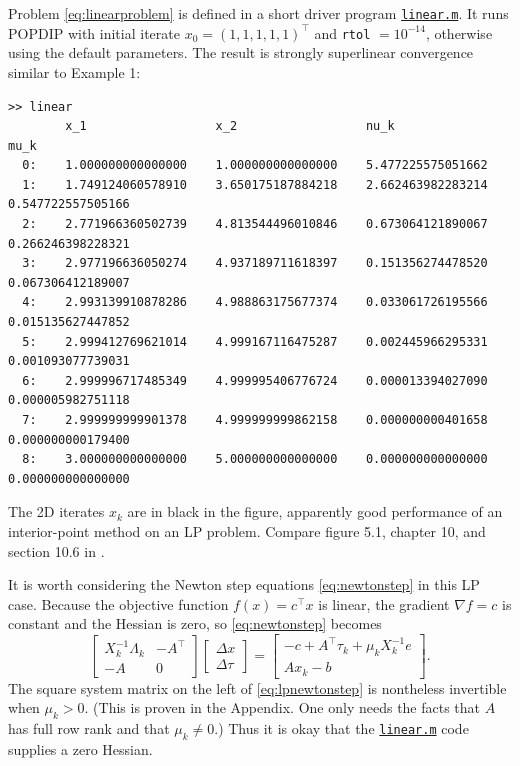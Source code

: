 \documentclass[11pt]{article}
\newcommand{\grad}{\nabla}
\begin{document}
Problem \eqref{eq:linearproblem} is defined in a short driver program \href{https://github.com/bueler/popdip/blob/main/matlab/linear.m}{\texttt{linear.m}}.  It runs POPDIP with initial iterate $x_0=(1,1,1,1,1)^\top$ and \texttt{rtol} $=10^{-14}$, otherwise using the default parameters.  The result is strongly superlinear convergence similar to Example 1:
\begin{Verbatim}[fontsize=\footnotesize]
>> linear
        x_1                  x_2                  nu_k                 mu_k
  0:    1.000000000000000    1.000000000000000    5.477225575051662
  1:    1.749124060578910    3.650175187884218    2.662463982283214    0.547722557505166
  2:    2.771966360502739    4.813544496010846    0.673064121890067    0.266246398228321
  3:    2.977196636050274    4.937189711618397    0.151356274478520    0.067306412189007
  4:    2.993139910878286    4.988863175677374    0.033061726195566    0.015135627447852
  5:    2.999412769621014    4.999167116475287    0.002445966295331    0.001093077739031
  6:    2.999996717485349    4.999995406776724    0.000013394027090    0.000005982751118
  7:    2.999999999901378    4.999999999862158    0.000000000401658    0.000000000179400
  8:    3.000000000000000    5.000000000000000    0.000000000000000    0.000000000000000
\end{Verbatim}

The 2D iterates $x_k$ are in black in the figure, apparently good performance of an interior-point method on an LP problem.  Compare figure 5.1, chapter 10, and section 10.6 in \cite{GrivaNashSofer2009}.

It is worth considering the Newton step equations \eqref{eq:newtonstep} in this LP case.  Because the objective function $f(x) = c^\top x$ is linear, the gradient $\grad f=c$ is constant and the Hessian is zero, so \eqref{eq:newtonstep} becomes
\begin{equation}
\begin{bmatrix}
X_k^{-1}\Lambda_k  & -A^\top \\
-A                 & 0
\end{bmatrix}
\begin{bmatrix}
\Delta x \\
\Delta \tau
\end{bmatrix}
=
\begin{bmatrix}
-c + A^\top \tau_k + \mu_k X_k^{-1} e \\
A x_k - b
\end{bmatrix}. \label{eq:lpnewtonstep}
\end{equation}
The square system matrix on the left of \eqref{eq:lpnewtonstep} is nontheless invertible when $\mu_k>0$.  (This is proven in the Appendix.  One only needs the facts that $A$ has full row rank and that $\mu_k\ne 0$.)  Thus it is okay that the \href{https://github.com/bueler/popdip/blob/main/matlab/linear.m}{\texttt{linear.m}} code supplies a zero Hessian.
\end{document}
